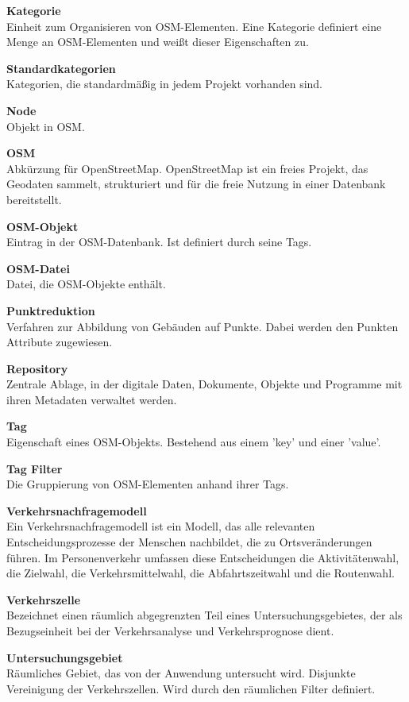 \documentclass[parskip=full]{scrartcl} %
\begin{document}
\textbf{Kategorie}\\
Einheit zum Organisieren von OSM-Elementen. Eine Kategorie definiert eine Menge an OSM-Elementen und weißt dieser Eigenschaften zu.

\textbf{Standardkategorien}\\
Kategorien, die standardmäßig in jedem Projekt vorhanden sind.

\textbf{Node}\\
Objekt in OSM.

\textbf{OSM}\\
Abkürzung für OpenStreetMap. OpenStreetMap ist ein freies Projekt, das Geodaten sammelt, strukturiert und für die freie Nutzung in einer Datenbank bereitstellt.

\textbf{OSM-Objekt}\\
Eintrag in der OSM-Datenbank. Ist definiert durch seine Tags.

\textbf{OSM-Datei}\\
Datei, die OSM-Objekte enthält.

\textbf{Punktreduktion}\\
Verfahren zur Abbildung von Gebäuden auf Punkte. Dabei werden den Punkten Attribute zugewiesen.

\textbf{Repository}\\
Zentrale Ablage, in der digitale Daten, Dokumente, Objekte und Programme mit ihren Metadaten verwaltet werden.

\textbf{Tag}\\
Eigenschaft eines OSM-Objekts. Bestehend aus einem 'key' und einer 'value'.

\textbf{Tag Filter}\\
Die Gruppierung von OSM-Elementen anhand ihrer Tags.

\textbf{Verkehrsnachfragemodell}\\
Ein Verkehrsnachfragemodell ist ein Modell, das alle relevanten Entscheidungsprozesse der Menschen nachbildet, die zu Ortsveränderungen führen. Im Personenverkehr umfassen diese Entscheidungen die Aktivitätenwahl, die Zielwahl, die Verkehrsmittelwahl, die Abfahrtszeitwahl und die Routenwahl.

\textbf{Verkehrszelle}\\
Bezeichnet einen räumlich abgegrenzten Teil eines Untersuchungsgebietes, der als Bezugseinheit bei der Verkehrsanalyse und Verkehrsprognose dient.

\textbf{Untersuchungsgebiet}\\
Räumliches Gebiet, das von der Anwendung untersucht wird. Disjunkte Vereinigung der Verkehrszellen. Wird durch den räumlichen Filter definiert.
\end{document}
